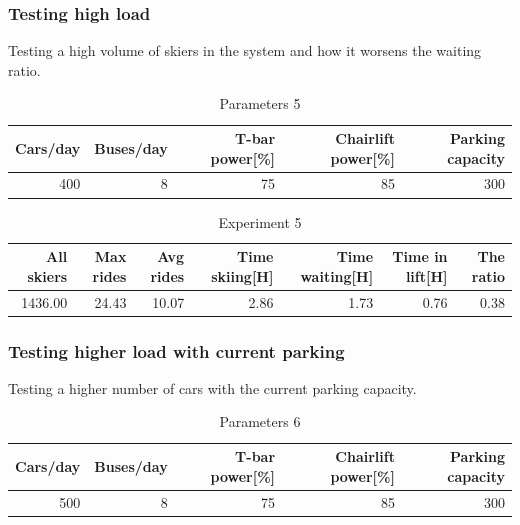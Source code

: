 \documentclass[11pt,a4paper]{article}
\begin{document}
\subsubsection{Testing high load}
Testing a high volume of skiers in the system and how it worsens the waiting ratio.
\begin{table}[H]
		\centering
		\begin{tabular}{|r|r|r|r|r|}
			\hline
			\textbf{Cars/day} &\textbf{Buses/day} & \textbf{T-bar power[\%]} 
				& \textbf{Chairlift power[\%]} & \textbf{Parking capacity} \\ \hline

			 400 & 8 & 75 & 85& 300\\ \hline
		\end{tabular}

		\caption{Parameters 5}
		\label{table:param5}
	\end{table}


\begin{table}[H]
    \centering
    \begin{tabular}{|r|r|r|r|r|r|r|}
        \hline
        \textbf{All skiers} &\textbf{Max rides} & \textbf{Avg rides} 
            & Time skiing[H] & Time waiting[H] & Time in lift[H]
            & \textbf{The ratio} \\ \hline

        1436.00 & 24.43 & 10.07 & 2.86 & 1.73 & 0.76 & 0.38  \\ \hline
    \end{tabular}

    \caption{Experiment 5}
    \label{table:experiment5}
\end{table}


\subsubsection{Testing higher load with current parking}
Testing a higher number of cars with the current parking capacity.
\begin{table}[H]
		\centering
		\begin{tabular}{|r|r|r|r|r|}
			\hline
			\textbf{Cars/day} &\textbf{Buses/day} & \textbf{T-bar power[\%]} 
				& \textbf{Chairlift power[\%]} & \textbf{Parking capacity} \\ \hline

			 500 & 8 & 75 & 85& 300\\ \hline
		\end{tabular}

		\caption{Parameters 6}
		\label{table:param6}
	\end{table}
\end{document}
